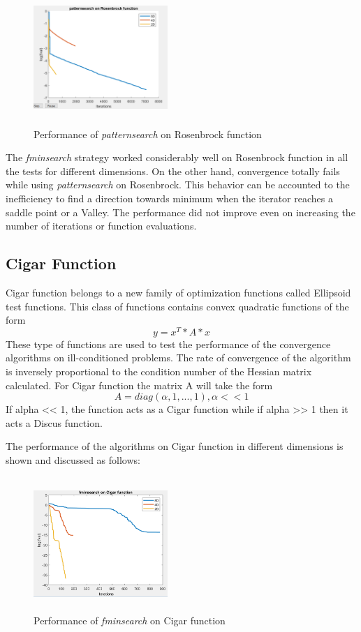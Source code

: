 \begin{figure}[H]
\includegraphics[height=2in, width=2in]{images/patternsearch_rosenbrock}
\caption{Performance of \textit{patternsearch} on Rosenbrock function}
\end{figure}

The \textit{fminsearch} strategy worked considerably well on Rosenbrock function in all the tests for different dimensions. On the other hand, convergence totally fails while using \textit{patternsearch} on Rosenbrock. This behavior can be accounted to the inefficiency to find a direction towards minimum when the iterator reaches a saddle point or a Valley. The performance did not improve even on increasing the number of iterations or function evaluations.

\subsection{Cigar Function}
Cigar function belongs to a new family of optimization functions called Ellipsoid test functions. This class of functions contains convex quadratic functions of the form
\begin{equation}
  y = x^T*A*x  
\end{equation}
These type of functions are used to test the performance of the convergence algorithms on ill-conditioned problems. The rate of convergence of the algorithm is inversely proportional to the condition number of the Hessian matrix calculated. For Cigar function the matrix A will take the form
\begin{equation}
  A = diag(\alpha, 1, . . . , 1), \alpha<<1 
\end{equation}
If alpha << 1, the function acts as a Cigar function while if alpha >> 1 then it acts a Discus function.

The performance of the algorithms on Cigar function in different dimensions is shown and discussed as follows:

\begin{figure}[H]
\includegraphics[height=2in, width=2in]{images/fminsearch_cigar}
\caption{Performance of \textit{fminsearch} on Cigar function}
\end{figure}

